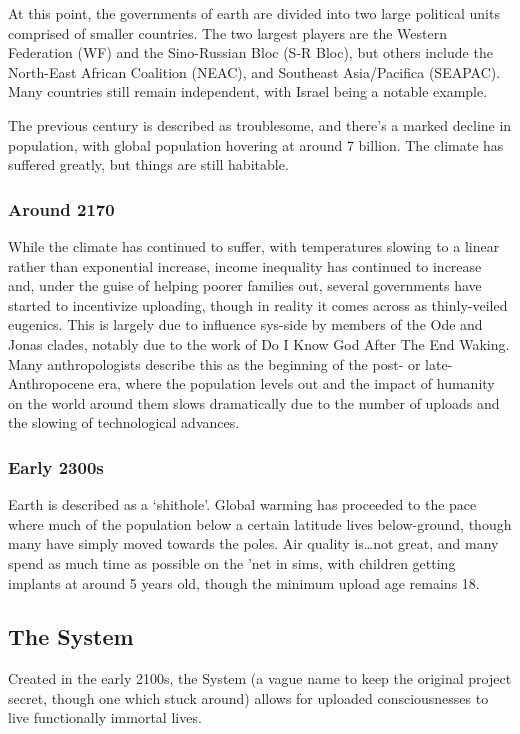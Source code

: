 At this point, the governments of earth are divided into two large political units comprised of smaller countries. The two largest players are the Western Federation (WF) and the Sino-Russian Bloc (S-R Bloc), but others include the North-East African Coalition (NEAC), and Southeast Asia/Pacifica (SEAPAC). Many countries still remain independent, with Israel being a notable example.

The previous century is described as troublesome, and there's a marked decline in population, with global population hovering at around 7 billion. The climate has suffered greatly, but things are still habitable.

\subsubsection{Around 2170}

While the climate has continued to suffer, with temperatures slowing to a linear rather than exponential increase, income inequality has continued to increase and, under the guise of helping poorer families out, several governments have started to incentivize uploading, though in reality it comes across as thinly-veiled eugenics. This is largely due to influence sys-side by members of the Ode and Jonas clades, notably due to the work of Do I Know God After The End Waking. Many anthropologists describe this as the beginning of the post- or late-Anthropocene era, where the population levels out and the impact of humanity on the world around them slows dramatically due to the number of uploads and the slowing of technological advances.

\subsubsection{Early 2300s}

Earth is described as a `shithole'. Global warming has proceeded to the pace where much of the population below a certain latitude lives below-ground, though many have simply moved towards the poles. Air quality is\ldots not great, and many spend as much time as possible on the 'net in sims, with children getting implants at around 5 years old, though the minimum upload age remains 18.

\subsection{The System}

Created in the early 2100s, the System (a vague name to keep the original project secret, though one which stuck around) allows for uploaded consciousnesses to live functionally immortal lives.

